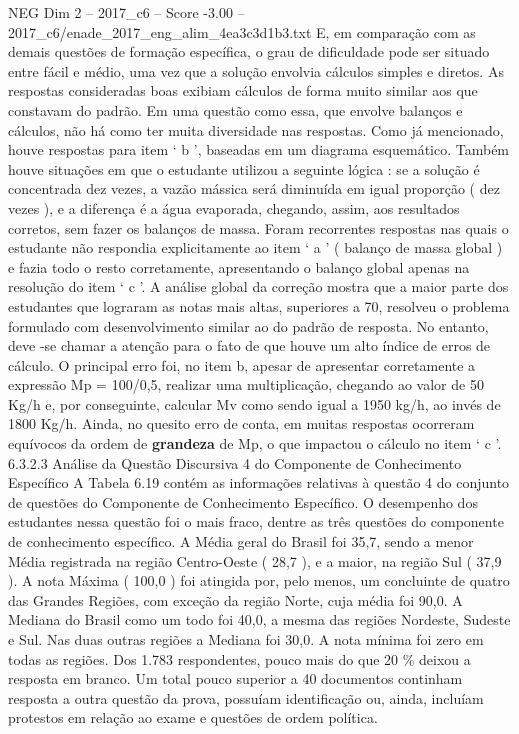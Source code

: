 \begin{textsample}{NEG Dim 2 – 2017\_c6 – Score -3.00 – 2017\_c6/enade\_2017\_eng\_alim\_4ea3c3d1b3.txt}
E, em comparação com as demais questões de formação específica, o grau de dificuldade pode ser situado entre fácil e médio, uma vez que a solução envolvia cálculos simples e diretos.
As respostas consideradas boas exibiam cálculos de forma muito similar aos que constavam do padrão.
Em uma questão como essa, que envolve balanços e cálculos, não há como ter muita diversidade nas respostas.
Como já mencionado, houve respostas para item ‘ b ’, baseadas em um diagrama esquemático.
Também houve situações em que o estudante utilizou a seguinte lógica : se a solução é concentrada dez vezes, a vazão mássica será diminuída em igual proporção ( dez vezes ), e a diferença é a água evaporada, chegando, assim, aos resultados corretos, sem fazer os balanços de massa.
Foram recorrentes respostas nas quais o estudante não respondia explicitamente ao item ‘ a ’ ( balanço de massa global ) e fazia todo o resto corretamente, apresentando o balanço global apenas na resolução do item ‘ c ’.
A análise global da correção mostra que a maior parte dos estudantes que lograram as notas mais altas, superiores a 70, resolveu o problema formulado com desenvolvimento similar ao do padrão de resposta.
No entanto, deve -se chamar a atenção para o fato de que houve um alto índice de erros de cálculo.
O principal erro foi, no item b, apesar de apresentar corretamente a expressão Mp = 100/0,5, realizar uma multiplicação, chegando ao valor de 50 Kg/h e, por conseguinte, calcular Mv como sendo igual a 1950 kg/h, ao invés de 1800 Kg/h.
Ainda, no quesito erro de conta, em muitas respostas ocorreram equívocos da ordem de \textbf{grandeza} de Mp, o que impactou o cálculo no item ‘ c ’. 6.3.2.3 Análise da Questão Discursiva 4 do Componente de Conhecimento Específico A Tabela 6.19 contém as informações relativas à questão 4 do conjunto de questões do Componente de Conhecimento Específico.
O desempenho dos estudantes nessa questão foi o mais fraco, dentre as três questões do componente de conhecimento específico.
A Média geral do Brasil foi 35,7, sendo a menor Média registrada na região Centro-Oeste ( 28,7 ), e a maior, na região Sul ( 37,9 ).
A nota Máxima ( 100,0 ) foi atingida por, pelo menos, um concluinte de quatro das Grandes Regiões, com exceção da região Norte, cuja média foi 90,0.
A Mediana do Brasil como um todo foi 40,0, a mesma das regiões Nordeste, Sudeste e Sul.
Nas duas outras regiões a Mediana foi 30,0.
A nota mínima foi zero em todas as regiões.
Dos 1.783 respondentes, pouco mais do que 20 \% deixou a resposta em branco.
Um total pouco superior a 40 documentos continham resposta a outra questão da prova, possuíam identificação ou, ainda, incluíam protestos em relação ao exame e questões de ordem política.

\end{textsample}
